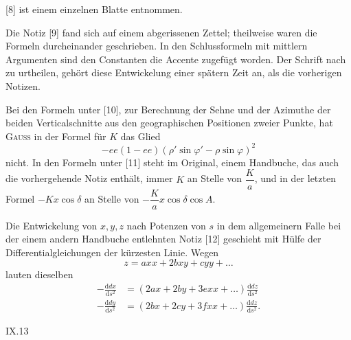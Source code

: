 {[8] ist einem einzelnen Blatte entnommen.

Die Notiz [9] fand sich auf einem abgerissenen Zettel; theilweise waren die Formeln durcheinander geschrieben. In den Schlussformeln mit mittlern Argumenten sind den Constanten die Accente zugefügt worden. Der Schrift nach zu urtheilen, gehört diese Entwickelung einer spätern Zeit an, als die vorherigen Notizen.

Bei den Formeln unter [10], zur Berechnung der Sehne und der Azimuthe der beiden Verticalschnitte aus den geographischen Positionen zweier Punkte, hat \textsc{Gauss} in der Formel für $K$ das Glied
\[
-ee(1-ee)(\rho'\sin\varphi'-\rho\sin\varphi)^2
\]
nicht. In den Formeln unter [11] steht im Original, einem Handbuche, das auch die vorhergehende Notiz enthält, immer $K$ an Stelle von $\dfrac Ka$, und in der letzten Formel $-Kx\cos\delta$ an Stelle von $-\dfrac Ka x\cos\delta\cos A$.

Die Entwickelung von $x,y,z$ nach Potenzen von $s$ in dem allgemeinern Falle bei der einem andern Handbuche entlehnten Notiz [12] geschieht mit Hülfe der Differentialgleichungen der kürzesten Linie. Wegen
\[
z=axx+2bxy+cyy+\ldots
\]
lauten dieselben
\[
\begin{aligned}
-\frac{\mathrm ddx}{\mathrm ds^2}&=(2ax+2by+3exx+\ldots)\frac{\mathrm ddz}{\mathrm ds^2}\\
-\frac{\mathrm ddy}{\mathrm ds^2}&=(2bx+2cy+3fxx+\ldots)\frac{\mathrm ddz}{\mathrm ds^2}.
\end{aligned}
\]
\par}
\noindent IX.\hfill 13\par

